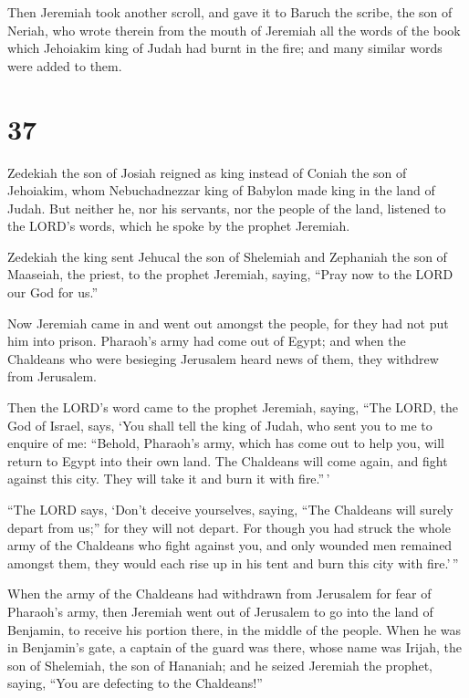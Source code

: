  Then Jeremiah took another scroll, and gave it to Baruch
the scribe, the son of Neriah, who wrote therein from the mouth of
Jeremiah all the words of the book which Jehoiakim king of Judah had
burnt in the fire; and many similar words were added to them.

\hypertarget{section-36}{%
\section{37}\label{section-36}}

 Zedekiah the son of Josiah reigned as king instead of
Coniah the son of Jehoiakim, whom Nebuchadnezzar king of Babylon made
king in the land of Judah.  But neither he, nor his
servants, nor the people of the land, listened to the LORD's words,
which he spoke by the prophet Jeremiah.

 Zedekiah the king sent Jehucal the son of Shelemiah and
Zephaniah the son of Maaseiah, the priest, to the prophet Jeremiah,
saying, ``Pray now to the LORD our God for us.''

 Now Jeremiah came in and went out amongst the people, for
they had not put him into prison.  Pharaoh's army had come
out of Egypt; and when the Chaldeans who were besieging Jerusalem heard
news of them, they withdrew from Jerusalem.

 Then the LORD's word came to the prophet Jeremiah, saying,
 ``The LORD, the God of Israel, says, `You shall tell the
king of Judah, who sent you to me to enquire of me: ``Behold, Pharaoh's
army, which has come out to help you, will return to Egypt into their
own land.  The Chaldeans will come again, and fight against
this city. They will take it and burn it with fire.''\,'

 ``The LORD says, `Don't deceive yourselves, saying, ``The
Chaldeans will surely depart from us;'' for they will not depart.
 For though you had struck the whole army of the Chaldeans
who fight against you, and only wounded men remained amongst them, they
would each rise up in his tent and burn this city with fire.'\,''

 When the army of the Chaldeans had withdrawn from
Jerusalem for fear of Pharaoh's army,  then Jeremiah went
out of Jerusalem to go into the land of Benjamin, to receive his portion
there, in the middle of the people.  When he was in
Benjamin's gate, a captain of the guard was there, whose name was
Irijah, the son of Shelemiah, the son of Hananiah; and he seized
Jeremiah the prophet, saying, ``You are defecting to the Chaldeans!''

